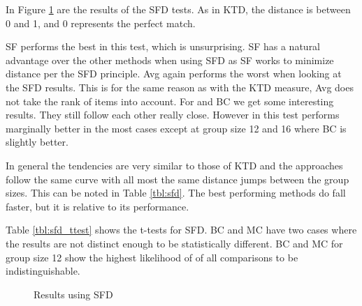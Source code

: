 In Figure \ref{fig:footruledistance} are the results of the SFD tests. As in KTD, the distance is between 0 and 1, and 0 represents the perfect match.

SF performs the best in this test, which is unsurprising. SF has a natural advantage over the other methods when using SFD as SF works to minimize distance per the SFD principle. Avg again performs the worst when looking at the SFD results. This is for the same reason as with the KTD measure, Avg does not take the rank of items into account. For \MC and BC we get some interesting results. They still follow each other really close. However in this test \MC performs marginally better in the most cases except at group size 12 and 16 where BC is slightly better.

In general the tendencies are very similar to those of KTD and the approaches follow the same curve with all most the same distance jumps between the group sizes. This can be noted in Table \ref{tbl:sfd}. The best performing methods do fall faster, but it is relative to its performance.

Table \ref{tbl:sfd_ttest} shows the t-tests for SFD. BC and MC have two cases where the results are not distinct enough to be statistically different. BC and MC for group size 12 show the highest likelihood of of all comparisons to be indistinguishable.
\begin{figure}[H]
\caption{Results using SFD} \label{fig:footruledistance}
\end{figure}

